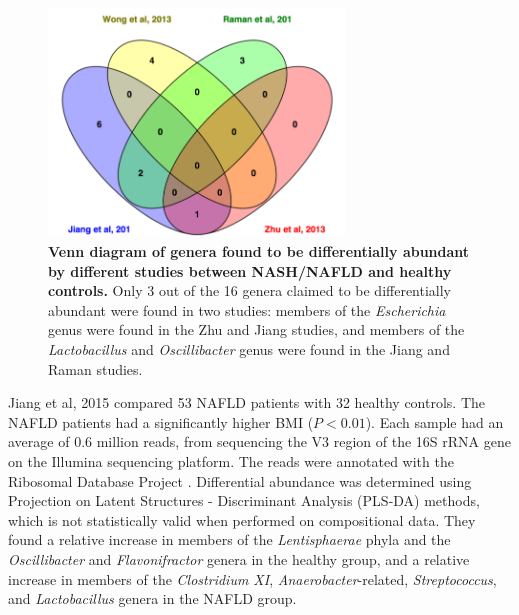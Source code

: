 \begin{figure}[h]
\begin{center}
\includegraphics[width=0.7\textwidth]{nafld_papers.png}
\caption[Venn diagram of genera found to be differentially abundant by different studies between NASH/NAFLD and healthy controls.]{\textbf{Venn diagram of genera found to be differentially abundant by different studies between NASH/NAFLD and healthy controls.} Only 3 out of the 16 genera claimed to be differentially abundant were found in two studies: members of the \textit{Escherichia} genus were found in the Zhu \cite{zhu2013characterization} and Jiang \cite{jiang2015dysbiosis} studies, and members of the \textit{Lactobacillus} and \textit{Oscillibacter} genus were found in the Jiang \cite{jiang2015dysbiosis} and Raman \cite{raman2013fecal} studies.}
\label{nafld_fig1}
\end{center}
\end{figure}

Jiang et al, 2015 \cite{jiang2015dysbiosis} compared 53 NAFLD patients with 32 healthy controls. The NAFLD patients had a significantly higher BMI ($P<0.01$). Each sample had an average of 0.6 million reads, from sequencing the V3 region of the 16S rRNA gene on the Illumina sequencing platform. The reads were annotated with the Ribosomal Database Project \cite{cole2009ribosomal}. Differential abundance was determined using Projection on Latent Structures - Discriminant Analysis (PLS-DA) methods, which is not statistically valid when performed on compositional data. They found a relative increase in members of the \textit{Lentisphaerae} phyla and the \textit{Oscillibacter} and \textit{Flavonifractor} genera in the healthy group, and a relative increase in members of the \textit{Clostridium XI}, \textit{Anaerobacter}-related, \textit{Streptococcus}, and \textit{Lactobacillus} genera in the NAFLD group.

